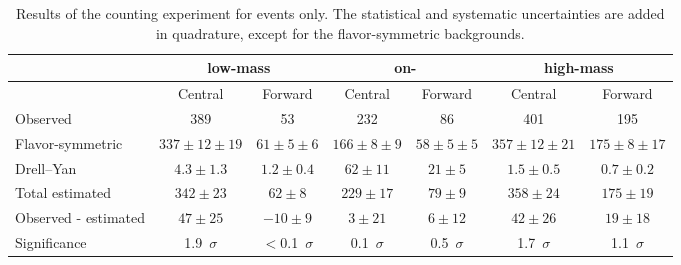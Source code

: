 
\begin{table}[hbtp]
 \renewcommand{\arraystretch}{1.3}
 \setlength{\belowcaptionskip}{6pt}
 \scriptsize
 \centering
 \caption{Results of the counting experiment for \EE events only.
     The statistical and systematic uncertainties are added in quadrature, except for the flavor-symmetric backgrounds.
     }
  \label{tab:METresults2012EE}
  \begin{tabular}{l| cc | cc | cc}

    							& \multicolumn{2}{c}{low-mass} & \multicolumn{2}{c}{on-\Z} & \multicolumn{2}{c}{high-mass} \\ 

    \hline
                                &  Central        & Forward  &  Central  & Forward   &  Central        & Forward \\ 

    \hline
        Observed       &  389                   & 53              &  232            &  86       &   401           &   195    \\

    \hline
        Flavor-symmetric    & $337\pm12\pm19$        & $61\pm5\pm6$  &  $166\pm8\pm9$ & $58\pm5\pm5$ & $357\pm12\pm21$ & $175\pm8\pm17$ \\

            Drell--Yan          & $4.3\pm1.3$            & $1.2\pm0.4$      & $62\pm11$ & $21\pm5$ & $1.5\pm0.5$ & $0.7\pm0.2$ \\

    \hline
            Total estimated          & $342\pm23$            & $62\pm8$      & $229\pm17$ & $79\pm9$ & $358\pm24$ & $175\pm19$ \\

    \hline
         Observed - estimated  & $47\pm25$      & $-10\pm9$ & $3\pm21 $ & $6\pm12$ & $42\pm26$ & $19\pm18 $ \\ 

    \hline
   Significance      & 1.9~$\sigma$    &  $<$0.1~$\sigma$  & 0.1~$\sigma$ & 0.5~$\sigma$ & 1.7~$\sigma$ & 1.1~$\sigma$ \\ 


  \end{tabular}
\end{table}


